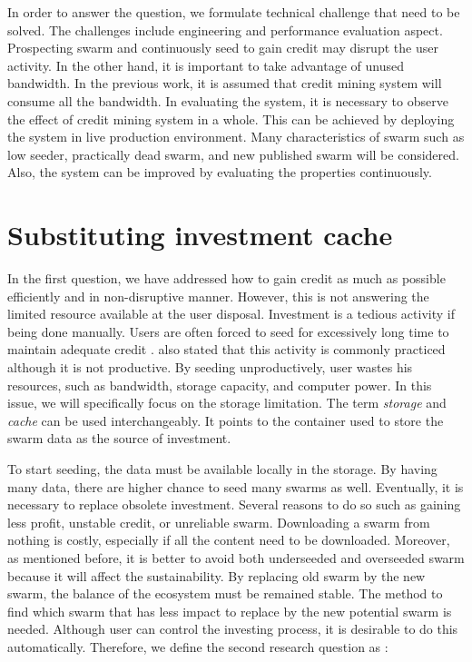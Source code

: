 In order to answer the question, we formulate technical challenge that need to be solved. The challenges include engineering and performance evaluation aspect. Prospecting swarm and continuously seed to gain credit may disrupt the user activity. In the other hand, it is important to take advantage of unused bandwidth. In the previous work, it is assumed that credit mining system will consume all the bandwidth. In evaluating the system, it is necessary to observe the effect of credit mining system in a whole. This can be achieved by deploying the system in live production environment. Many characteristics of swarm such as low seeder, practically dead swarm, and new published swarm will be considered. Also, the system can be improved by evaluating the properties continuously.

\section{Substituting investment cache}
In the first question, we have addressed how to gain credit as much as possible efficiently and in non-disruptive manner. However, this is not answering the limited resource available at the user disposal. Investment is a tedious activity if being done manually. Users are often forced to seed for excessively long time to maintain adequate credit \cite{2013:survivepriv:jia}. \citeauthor{2013:survivepriv:jia} also stated that this activity is commonly practiced although it is not productive. By seeding unproductively, user wastes his resources, such as bandwidth, storage capacity, and computer power. In this issue, we will specifically focus on the storage limitation. The term \textit{storage} and \textit{cache} can be used interchangeably. It points to the container used to store the swarm data as the source of investment.

To start seeding, the data must be available locally in the storage. By having many data, there are higher chance to seed many swarms as well. Eventually, it is necessary to replace obsolete investment. Several reasons to do so such as gaining less profit, unstable credit, or unreliable swarm. Downloading a swarm from nothing is costly, especially if all the content need to be downloaded. Moreover, as mentioned before, it is better to avoid both underseeded and overseeded swarm because it will affect the sustainability. By replacing old swarm by the new swarm, the balance of the ecosystem must be remained stable. The method to find which swarm that has less impact to replace by the new potential swarm is needed. Although user can control the investing process, it is desirable to do this automatically. Therefore, we define the second research question as : 

